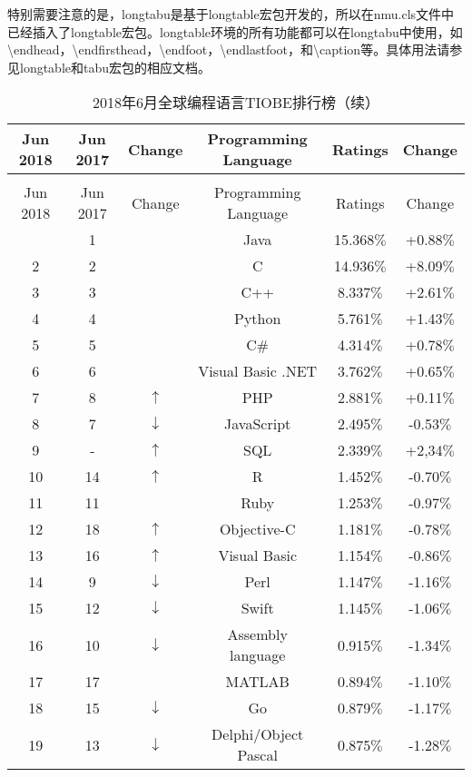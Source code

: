 特别需要注意的是，longtabu是基于longtable宏包开发的，所以在nmu.cls文件中已经插入了longtable宏包。longtable环境的所有功能都可以在longtabu中使用，如\textbackslash endhead，\textbackslash endfirsthead，\textbackslash endfoot，\textbackslash endlastfoot，和\textbackslash caption等。具体用法请参见longtable和tabu宏包的相应文档。
\begin{longtabu}{cccccc}
	\caption{2018年6月全球编程语言TIOBE排行榜}\label{tab:tabu_test_3}\\
	\toprule
	Jun 2018   & Jun 2017 & Change & Programming Language & Ratings &Change\\
	\midrule%
	\endfirsthead
	\caption{2018年6月全球编程语言TIOBE排行榜（续）}\\
	\toprule
	Jun 2018   & Jun 2017 & Change & Programming Language & Ratings &Change \\
	\midrule%
	\endhead
	\bottomrule%
		&	1	&		&	Java	&	15.368$\%$	&	+0.88$\%$	\\
	2	&	2	&		&	C	&	14.936$\%$	&	+8.09$\%$	\\
	3	&	3	&		&	C++	&	8.337$\%$	&	+2.61$\%$	\\
	4	&	4	&		&	Python	&	5.761$\%$	&	+1.43$\%$	\\
	5	&	5	&		&	C$\#$	&	4.314$\%$	&	+0.78$\%$	\\
	6	&	6	&		&	Visual Basic .NET	&	3.762$\%$	&	+0.65$\%$	\\
	7	&	8	&	$\uparrow$	&	PHP	&	2.881$\%$	&	+0.11$\%$	\\
	8	&	7	&	$\downarrow$	&	JavaScript	&	2.495$\%$	&	-0.53$\%$	\\
	9	&	-	&	$\uparrow$	&	SQL	&	2.339$\%$	&	+2,34$\%$	\\
	10	&	14	&	$\uparrow$	&	R	&	1.452$\%$	&	-0.70$\%$	\\
	11	&	11	&		&	Ruby	&	1.253$\%$	&	-0.97$\%$	\\
	12	&	18	&	$\uparrow$	&	Objective-C	&	1.181$\%$	&	-0.78$\%$	\\
	13	&	16	&	$\uparrow$	&	Visual Basic	&	1.154$\%$	&	-0.86$\%$	\\
	14	&	9	&	$\downarrow$	&	Perl	&	1.147$\%$	&	-1.16$\%$	\\
	15	&	12	&	$\downarrow$	&	Swift	&	1.145$\%$	&	-1.06$\%$	\\
	16	&	10	&	$\downarrow$	&	Assembly language	&	0.915$\%$	&	-1.34$\%$	\\
	17	&	17	&		&	MATLAB	&	0.894$\%$	&	-1.10$\%$	\\
	18	&	15	&	$\downarrow$	&	Go	&	0.879$\%$	&	-1.17$\%$	\\
	19	&	13	&	$\downarrow$	&	Delphi/Object Pascal	&	0.875$\%$	&	-1.28$\%$	\\

\end{longtabu}
